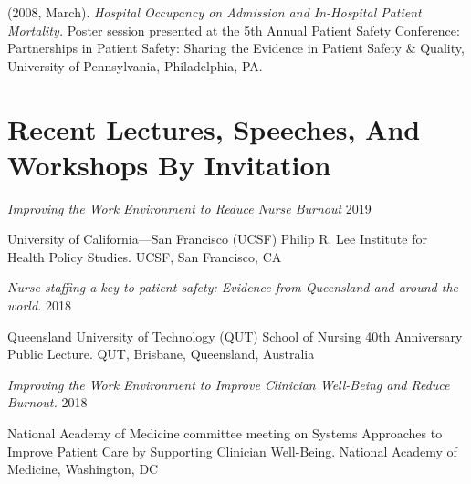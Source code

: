 \documentclass[10pt,]{article}
\begin{document}
{{{{{{{{{{{{{{\begin{hangparas}{.25in}{1}
\end{hangparas}

\vspace{4mm}

\begin{hangparas}{.25in}{1}

 (2008, March). {\textit {Hospital Occupancy on Admission and In-Hospital Patient Mortality.}} Poster session presented at the 5th Annual Patient Safety Conference: Partnerships in Patient Safety: Sharing the Evidence in Patient Safety \& Quality, University of Pennsylvania, Philadelphia, PA.

\end{hangparas}

\vspace{4mm}

\section{\Large \sc Recent Lectures, Speeches, And Workshops By Invitation}

\begin{hangparas}{.5in}{1}

{\textit {Improving the Work Environment to Reduce Nurse Burnout}} \hfill 2019 
\vspace{-2.5mm}
\begin{adjustwidth}{0.5cm}{1cm}
University of California—San Francisco (UCSF) Philip R. Lee Institute for Health Policy Studies. UCSF, San Francisco, CA
\end{adjustwidth}

{\textit {Nurse staffing a key to patient safety: Evidence from Queensland and around the world.}} \hfill 2018 
\vspace{-2.5mm}
\begin{adjustwidth}{0.5cm}{1cm}
Queensland University of Technology (QUT) School of Nursing 40th Anniversary Public Lecture. QUT, Brisbane, Queensland, Australia
\end{adjustwidth}

{\textit {Improving the Work Environment to Improve Clinician Well-Being and Reduce Burnout.}} \hfill 2018 
\vspace{-2.5mm}
\begin{adjustwidth}{0.5cm}{1cm}
National Academy of Medicine committee meeting on Systems Approaches to Improve Patient Care by Supporting Clinician Well-Being. National Academy of Medicine, Washington, DC
\end{adjustwidth}


\end{hangparas}}}}}}}}}}}}}}}
\end{document}
